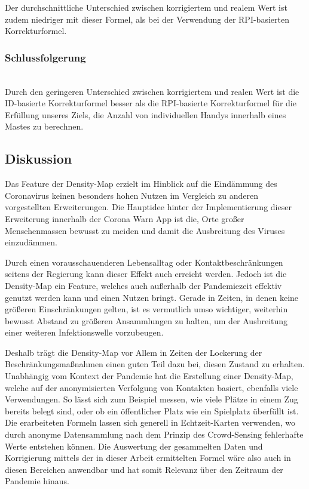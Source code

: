 \documentclass[conference,compsoc]{IEEEtran}
\begin{document}
Der durchschnittliche Unterschied zwischen korrigiertem und realem Wert ist zudem niedriger mit dieser Formel, als bei der Verwendung der RPI-basierten Korrekturformel.\\

\subsubsection{Schlussfolgerung}
\text{}\\
Durch den geringeren Unterschied zwischen korrigiertem und realen Wert ist die ID-basierte Korrekturformel besser als die RPI-basierte Korrekturformel für die Erfüllung unseres Ziels, 
die Anzahl von individuellen Handys innerhalb eines Mastes zu berechnen.

\subsection{Diskussion}
Das Feature der Density-Map erzielt im Hinblick auf die Eindämmung des Coronavirus keinen besonders hohen Nutzen im Vergleich zu anderen vorgestellten Erweiterungen.
Die Hauptidee hinter der Implementierung dieser Erweiterung innerhalb der Corona Warn App ist die, Orte großer Menschenmassen bewusst zu meiden und damit die Ausbreitung des Viruses einzudämmen.

Durch einen vorausschauenderen Lebensalltag oder Kontaktbeschränkungen seitens der Regierung kann dieser Effekt auch erreicht werden.
Jedoch ist die Density-Map ein Feature, welches auch außerhalb der Pandemiezeit effektiv genutzt werden kann und einen Nutzen bringt.
Gerade in Zeiten, in denen keine größeren Einschränkungen gelten, ist es vermutlich umso wichtiger, weiterhin bewusst Abstand zu größeren Ansammlungen zu halten, 
um der Ausbreitung einer weiteren Infektionswelle vorzubeugen.

Deshalb trägt die Density-Map vor Allem in Zeiten der Lockerung der Beschränkungsmaßnahmen einen guten Teil dazu bei, diesen Zustand zu erhalten.
Unabhängig vom Kontext der Pandemie hat die Erstellung einer Density-Map, welche auf der anonymisierten Verfolgung von Kontakten basiert, ebenfalls viele Verwendungen.
So lässt sich zum Beispiel messen, wie viele Plätze in einem Zug bereits belegt sind, oder ob ein öffentlicher Platz wie ein Spielplatz überfüllt ist. 
Die erarbeiteten Formeln lassen sich generell in Echtzeit-Karten verwenden, wo durch anonyme Datensammlung nach dem Prinzip des Crowd-Sensing fehlerhafte Werte entstehen können.
Die Auswertung der gesammelten Daten und Korrigierung mittels der in dieser Arbeit ermittelten Formel wäre also auch in diesen Bereichen anwendbar und hat somit Relevanz über den Zeitraum der Pandemie hinaus.
\end{document}
